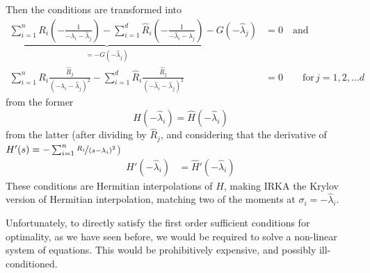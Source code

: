 \documentclass{article}
\begin{document}
	Then the conditions are transformed into
	\begin{align*}
		 \underbrace{\sum_{i=1}^{n} R_i \left(- \frac{1}{-{\lambda}_i-\hat{\lambda}_j}\right) - \sum_{i=1}^{d} \hat{R}_i \left(- \frac{1}{-\hat{\lambda}_i-\hat{\lambda}_j}\right)}_{=- G(-\hat{\lambda}_j)} - G(-\hat{\lambda}_j) &= 0
		\quad \mathrm{and}\\
		 \sum_{i=1}^{n} R_i \frac{\hat{R}_j}{\left(-{\lambda}_i-\hat{\lambda}_j\right)^2} - \sum_{i=1}^{d} \hat{R}_i \frac{\hat{R}_j}{\left(-\hat{\lambda}_i-\hat{\lambda}_j\right)^2} &= 0 \quad \quad \mathrm{for} \, j=1,2, \dots d
	\end{align*}
	from the former 
	\begin{equation}
		H(-\hat{\lambda}_i)=\hat{H}(-\hat{\lambda}_i)
	\end{equation}
	from the latter (after dividing by $\hat{R}_j$, and considering that the derivative of $H^\prime(s) = -\sum_{i=1}^{n} \nicefrac{R_i}{\left(s-\lambda_i\right)^2}$)
	\begin{align}
		H'(-\hat{\lambda}_i)&=\hat{H}'(-\hat{\lambda}_i)
	\end{align}
	These conditions are Hermitian interpolations of $H$, making IRKA the Krylov version of Hermitian interpolation, matching two of the moments at $\sigma_i = -\hat{\lambda}_i$. 
	
	
	
	Unfortunately, to directly satisfy the first order sufficient conditions for optimality, as we have seen before, we would be required to solve a non-linear system of equations. This would be prohibitively expensive, and possibly ill-conditioned.
\end{document}
